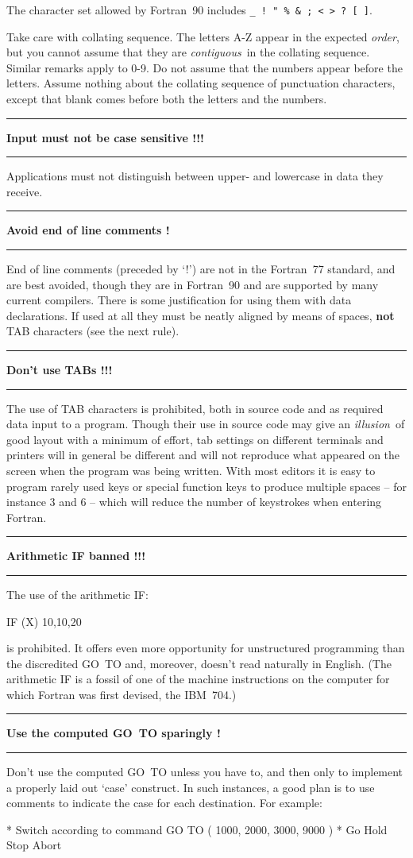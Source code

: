 \documentclass[twoside,11pt,nolof,noabs]{starlink}
\newcounter{sruleno}
\providecommand{\srule}[1]{
    \addtocounter{sruleno}{1}
    \goodbreak
    \rule{\textwidth}{0.3mm}
    \textbf{#1} \scpushright{ \textbf{\thesruleno}}
    \rule{\textwidth}{0.1mm}
}
\renewcommand{\_}{{\tt\char'137}}
\begin{document}
The character set allowed by Fortran~90 includes \verb|_ ! " % & ; < > ? [ ]|.

Take care with collating sequence.  The letters A-Z appear in the
expected \textit{order}, but you cannot assume
that they are \textit{contiguous}\, in
the collating sequence.  Similar remarks apply to 0-9.  Do not
assume that the numbers appear before the letters.  Assume
nothing about the collating sequence of punctuation characters,
except that blank comes before both the letters and the numbers.

\srule{Input must not be case sensitive !!!}
Applications must not distinguish between upper- and lowercase in data they
receive.

\srule{Avoid end of line comments !}
End of line comments (preceded by `!') are not in the
Fortran~77 standard, and are best avoided, though they
are in Fortran~90 and are supported by many current compilers.
There is some justification for using them with data declarations.
If used at all they must be neatly aligned by means of spaces, \textbf{not}
TAB characters (see the next rule).

\srule{Don't use TABs !!!}
The use of TAB characters is prohibited, both in source code and as required
data input to a program.
Though their use in source code may give an \textit{illusion}\,
of good layout with a
minimum of effort, tab settings on different terminals and printers will in
general be different and will not reproduce what appeared on the screen when the
program was being written.
With most editors it is easy to program rarely
used keys or special function keys to produce multiple spaces -- for instance
3 and 6 -- which will reduce the number of keystrokes when entering Fortran.

\srule{Arithmetic IF banned !!!}
The use of the arithmetic IF:
\begin{terminalv}
    IF (X) 10,10,20
\end{terminalv}
is prohibited.
It offers even more opportunity for unstructured programming than the
discredited GO~TO and, moreover, doesn't read naturally in
English.
(The arithmetic IF is a fossil of one of the
machine instructions on the computer for which Fortran was
first devised, the IBM~704.)

\srule{Use the computed GO~TO sparingly !}
Don't use the computed GO~TO unless you have to, and then only to
implement a properly laid out `case' construct.  In such instances, a good
plan is to use comments to indicate the case for each destination.
For example:
\begin{terminalv}
    *  Switch according to command
          GO TO ( 1000, 2000, 3000, 9000 )
    *               Go  Hold  Stop  Abort
\end{terminalv}
\end{document}

